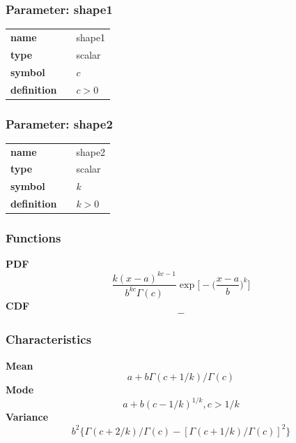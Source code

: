 \subsubsection*{Parameter: shape1}

\noindent\begin{tabular}{p{2cm}cl}
\textbf{name} & & shape1 \\
\textbf{type} & & scalar \\
\textbf{symbol} & & $c$  \\
\textbf{definition} & & $c > 0$
\end{tabular}
\subsubsection*{Parameter: shape2}

\noindent\begin{tabular}{p{2cm}cl}
\textbf{name} & & shape2 \\
\textbf{type} & & scalar \\
\textbf{symbol} & & $k$  \\
\textbf{definition} & & $k > 0$
\end{tabular}
\subsubsection*{Functions}

\smallskip \noindent \hspace{.2cm} \textbf{PDF} 
\begin{equation*}\frac{k (x-a)^{kc-1}}{b^{kc}\Gamma(c)}\exp\Big[-\Big(\frac{x-a}{b}\Big)^k\Big]\end{equation*}
\smallskip \noindent \hspace{.2cm} \textbf{CDF} 
\begin{equation*}-\end{equation*}
\smallskip
\subsubsection*{Characteristics}
\smallskip \noindent \hspace{.2cm} \textbf{Mean} 
\begin{equation*}a + b\Gamma(c+1/k)/\Gamma(c)\end{equation*}
\smallskip \noindent \hspace{.2cm} \textbf{Mode} 
\begin{equation*}a+b(c-1/k)^{1/k}, c>1/k\end{equation*}
\smallskip \noindent \hspace{.2cm} \textbf{Variance} 
\begin{equation*}b^2\{\Gamma(c+2/k)/\Gamma(c)-[\Gamma(c+1/k)/\Gamma(c)]^2\}\end{equation*}
\smallskip
